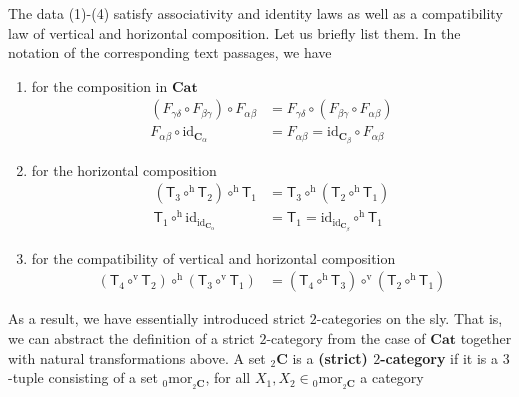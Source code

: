 The data (1)-(4) satisfy associativity and identity laws as well as a compatibility law of vertical and horizontal composition.
Let us briefly list them.
In the notation of the corresponding text passages, we have
\begin{enumerate}
\item[(i)]
for the composition in $\mathbf{Cat}$
\begin{align*}
  \left(
    F_{\gamma\delta}
    \circ
    F_{\beta\gamma}
  \right)
  \circ
  F_{\alpha\beta}
  &=
  F_{\gamma\delta}
  \circ
  \left(
    F_{\beta\gamma}
    \circ
    F_{\alpha\beta}
  \right)
  \\
  F_{\alpha\beta}
  \circ
  \mathrm{id}_{\mathbf{C}_{\alpha}}
  &=
  F_{\alpha\beta}
  =
  \mathrm{id}_{\mathbf{C}_{\beta}}
  \circ
  F_{\alpha\beta}
\end{align*}
\item[(ii)]
for the horizontal composition
\begin{align*}
  \left(
    \mathsf{T}_{3}
    \circ^{\textrm{h}}
    \mathsf{T}_{2}
  \right)
  \circ^{\textrm{h}}
  \mathsf{T}_{1}
  &=
  \mathsf{T}_{3}
  \circ^{\textrm{h}}
  \left(
    \mathsf{T}_{2}
    \circ^{\textrm{h}}
    \mathsf{T}_{1}
  \right)
  \\
  \mathsf{T}_{1}
  \circ^{\textrm{h}}
  \mathrm{id}_{\mathrm{id}_{\mathbf{C}_{\alpha}}}
  &=
  \mathsf{T}_{1}
  =
  \mathrm{id}_{\mathrm{id}_{\mathbf{C}_{\beta}}}
  \circ^{\textrm{h}}
  \mathsf{T}_{1}
\end{align*}
\item[(iii)]
for the compatibility of vertical and horizontal composition
\begin{align*}
  \left(
    \mathsf{T}_{4}
    \circ^{\textrm{v}}
    \mathsf{T}_{2}
  \right)
  \circ^{\textrm{h}}
  \left(
    \mathsf{T}_{3}
    \circ^{\textrm{v}}
    \mathsf{T}_{1}
  \right)
  &=
  \left(
    \mathsf{T}_{4}
    \circ^{\textrm{h}}
    \mathsf{T}_{3}
  \right)
  \circ^{\textrm{v}}
  \left(
    \mathsf{T}_{2}
    \circ^{\textrm{h}}
    \mathsf{T}_{1}
  \right)
\end{align*}
\end{enumerate}
As a result, we have essentially introduced strict $2$-categories on the sly.
That is, we can abstract the definition of a strict $2$-category from the case of $\mathbf{Cat}$ together with natural transformations above.
A set ${}_{2}\mathbf{C}$ is a \textbf{(strict) $2$-category} if it is a $3$-tuple consisting of a set ${}_{0}\mathrm{mor}_{{}_{2}\mathbf{C}}$, for all $X_{1},X_{2} \in {}_{0}\mathrm{mor}_{_{2}\mathbf{C}}$ a category
